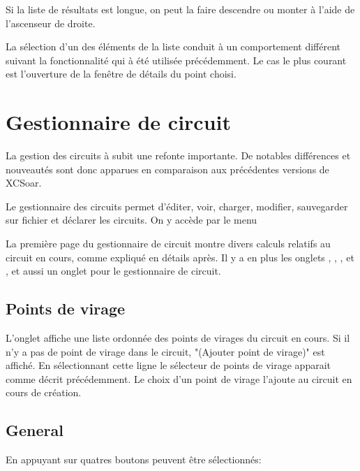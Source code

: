 Si la liste de résultats est longue, on peut la faire descendre ou monter à l'aide de l'ascenseur de droite. 

La sélection d'un des éléments de la liste conduit à un comportement différent suivant la fonctionnalité qui à été utilisée précédemment. Le cas le plus courant est l'ouverture de la fenêtre de détails du point choisi. 

\section{Gestionnaire de circuit}\label{sec:task-manager-dialog}
\begin{it}  La gestion des circuits à subit une refonte importante. De notables différences et nouveautés sont donc apparues en comparaison aux précédentes versions de XCSoar.\end{it}

Le gestionnaire des circuits permet d'éditer, voir, charger, modifier, sauvegarder sur fichier et déclarer les circuits. On y accède par le menu
\begin{quote}
\blink{}
\end{quote} 

La première page du gestionnaire de circuit montre divers calculs relatifs au circuit en cours, comme expliqué en détails après. Il y a en plus les onglets   , , , et  , et aussi un onglet pour  le gestionnaire de circuit.

\subsection*{Points de virage}
L'onglet  affiche une liste ordonnée des points de virages du circuit en cours. Si il n'y a pas de point de virage dans le circuit,  "(Ajouter point de virage)" est affiché. En sélectionnant cette ligne le sélecteur de points de virage apparait comme décrit précédemment. Le choix d'un point de virage l'ajoute au circuit en cours de création.

\subsection*{General}
En appuyant sur  quatres boutons peuvent être sélectionnés:


